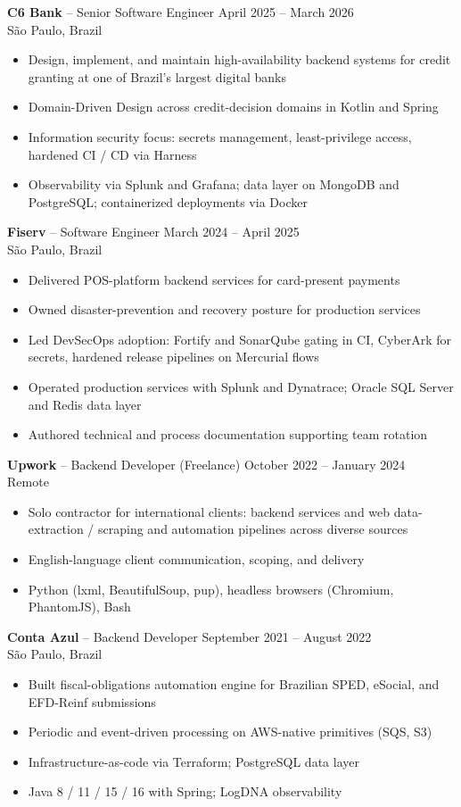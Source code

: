\documentclass[10pt,a4paper]{article}
\begin{document}
\noindent\textbf{C6 Bank} -- Senior Software Engineer \hfill April 2025 -- March 2026\\
São Paulo, Brazil
\begin{itemize}
\item Design, implement, and maintain high-availability backend systems for credit granting at one of Brazil's largest digital banks
\item Domain-Driven Design across credit-decision domains in Kotlin and Spring
\item Information security focus: secrets management, least-privilege access, hardened CI / CD via Harness
\item Observability via Splunk and Grafana; data layer on MongoDB and PostgreSQL; containerized deployments via Docker
\end{itemize}

\noindent\textbf{Fiserv} -- Software Engineer \hfill March 2024 -- April 2025\\
São Paulo, Brazil
\begin{itemize}
\item Delivered POS-platform backend services for card-present payments
\item Owned disaster-prevention and recovery posture for production services
\item Led DevSecOps adoption: Fortify and SonarQube gating in CI, CyberArk for secrets, hardened release pipelines on Mercurial flows
\item Operated production services with Splunk and Dynatrace; Oracle SQL Server and Redis data layer
\item Authored technical and process documentation supporting team rotation
\end{itemize}

\noindent\textbf{Upwork} -- Backend Developer (Freelance) \hfill October 2022 -- January 2024\\
Remote
\begin{itemize}
\item Solo contractor for international clients: backend services and web data-extraction / scraping and automation pipelines across diverse sources
\item English-language client communication, scoping, and delivery
\item Python (lxml, BeautifulSoup, pup), headless browsers (Chromium, PhantomJS), Bash
\end{itemize}

\noindent\textbf{Conta Azul} -- Backend Developer \hfill September 2021 -- August 2022\\
São Paulo, Brazil
\begin{itemize}
\item Built fiscal-obligations automation engine for Brazilian SPED, eSocial, and EFD-Reinf submissions
\item Periodic and event-driven processing on AWS-native primitives (SQS, S3)
\item Infrastructure-as-code via Terraform; PostgreSQL data layer
\item Java 8 / 11 / 15 / 16 with Spring; LogDNA observability
\end{itemize}
\end{document}
